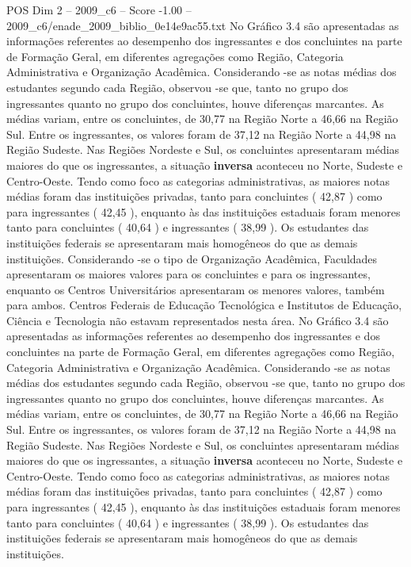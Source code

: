 \begin{textsample}{POS Dim 2 – 2009\_c6 – Score -1.00 – 2009\_c6/enade\_2009\_biblio\_0e14e9ac55.txt}
No Gráfico 3.4 são apresentadas as informações referentes ao desempenho dos ingressantes e dos concluintes na parte de Formação Geral, em diferentes agregações como Região, Categoria Administrativa e Organização Acadêmica.
Considerando -se as notas médias dos estudantes segundo cada Região, observou -se que, tanto no grupo dos ingressantes quanto no grupo dos concluintes, houve diferenças marcantes.
As médias variam, entre os concluintes, de 30,77 na Região Norte a 46,66 na Região Sul.
Entre os ingressantes, os valores foram de 37,12 na Região Norte a 44,98 na Região Sudeste.
Nas Regiões Nordeste e Sul, os concluintes apresentaram médias maiores do que os ingressantes, a situação \textbf{inversa} aconteceu no Norte, Sudeste e Centro-Oeste.
Tendo como foco as categorias administrativas, as maiores notas médias foram das instituições privadas, tanto para concluintes ( 42,87 ) como para ingressantes ( 42,45 ), enquanto às das instituições estaduais foram menores tanto para concluintes ( 40,64 ) e ingressantes ( 38,99 ).
Os estudantes das instituições federais se apresentaram mais homogêneos do que as demais instituições.
Considerando -se o tipo de Organização Acadêmica, Faculdades apresentaram os maiores valores para os concluintes e para os ingressantes, enquanto os Centros Universitários apresentaram os menores valores, também para ambos.
Centros Federais de Educação Tecnológica e Institutos de Educação, Ciência e Tecnologia não estavam representados nesta área.
No Gráfico 3.4 são apresentadas as informações referentes ao desempenho dos ingressantes e dos concluintes na parte de Formação Geral, em diferentes agregações como Região, Categoria Administrativa e Organização Acadêmica.
Considerando -se as notas médias dos estudantes segundo cada Região, observou -se que, tanto no grupo dos ingressantes quanto no grupo dos concluintes, houve diferenças marcantes.
As médias variam, entre os concluintes, de 30,77 na Região Norte a 46,66 na Região Sul.
Entre os ingressantes, os valores foram de 37,12 na Região Norte a 44,98 na Região Sudeste.
Nas Regiões Nordeste e Sul, os concluintes apresentaram médias maiores do que os ingressantes, a situação \textbf{inversa} aconteceu no Norte, Sudeste e Centro-Oeste.
Tendo como foco as categorias administrativas, as maiores notas médias foram das instituições privadas, tanto para concluintes ( 42,87 ) como para ingressantes ( 42,45 ), enquanto às das instituições estaduais foram menores tanto para concluintes ( 40,64 ) e ingressantes ( 38,99 ).
Os estudantes das instituições federais se apresentaram mais homogêneos do que as demais instituições.

\end{textsample}
